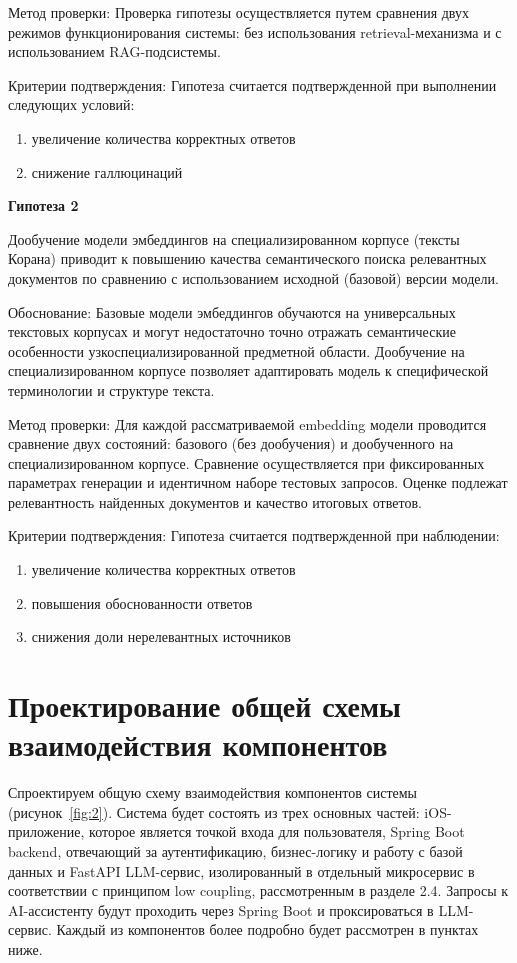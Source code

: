 Метод проверки: Проверка гипотезы осуществляется путем сравнения двух режимов функционирования системы: без использования retrieval-механизма и с использованием RAG-подсистемы.


Критерии подтверждения:\textbf{ }Гипотеза считается подтвержденной при выполнении следующих условий:

\begin{enumerate}
	\item увеличение количества корректных ответов
	\item снижение галлюцинаций
\end{enumerate}

\textbf{Гипотеза 2  }


Дообучение модели эмбеддингов на специализированном корпусе (тексты Корана) приводит к повышению качества семантического поиска релевантных документов по сравнению с использованием исходной (базовой) версии модели.


Обоснование: Базовые модели эмбеддингов обучаются на универсальных текстовых корпусах и могут недостаточно точно отражать семантические особенности узкоспециализированной предметной области. Дообучение на специализированном корпусе позволяет адаптировать модель к специфической терминологии и структуре текста.


Метод проверки:\textbf{ }Для каждой рассматриваемой embedding модели проводится сравнение двух состояний: базового (без дообучения) и дообученного на специализированном корпусе. Сравнение осуществляется при фиксированных параметрах генерации и идентичном наборе тестовых запросов. Оценке подлежат релевантность найденных документов и качество итоговых ответов.


Критерии подтверждения: Гипотеза считается подтвержденной при наблюдении:

\begin{enumerate}
	\item увеличение количества корректных ответов
	\item повышения обоснованности ответов
	\item снижения доли нерелевантных источников
\end{enumerate}

\section{Проектирование общей схемы взаимодействия компонентов}


Спроектируем общую схему взаимодействия компонентов системы (рисунок~\ref{fig:2}). Система будет состоять из трех основных частей: iOS-приложение, которое является точкой входа для пользователя, Spring Boot backend, отвечающий за аутентификацию, бизнес-логику и работу с базой данных и FastAPI LLM-сервис, изолированный в отдельный микросервис в соответствии с принципом low coupling, рассмотренным в разделе 2.4. Запросы к AI-ассистенту будут проходить через Spring Boot и проксироваться в LLM-сервис. Каждый из компонентов более подробно будет рассмотрен в пунктах ниже.


